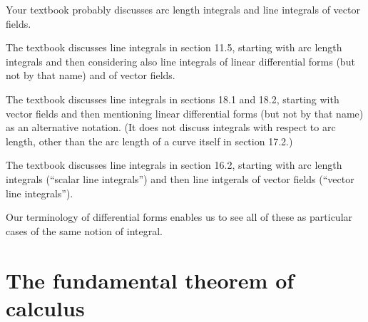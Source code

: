\documentclass[12pt]{amsart}
\begin{document}
\begin{notextbook}Your textbook probably discusses arc length integrals and line integrals of vector fields.\end{notextbook}%
\begin{stewart}The textbook discusses line integrals in section 11.5, starting with arc length integrals and then considering also line integrals of linear differential forms (but not by that name) and of vector fields.\end{stewart}%
\begin{hugheshallett}The textbook discusses line integrals in sections 18.1 and 18.2, starting with vector fields and then mentioning linear differential forms (but not by that name) as an alternative notation.
(It does not discuss integrals with respect to arc length, other than the arc length of a curve itself in section 17.2.)\end{hugheshallett}%
\begin{rogawski}The textbook discusses line integrals in section 16.2, starting with arc length integrals (``scalar line integrals'') and then line intgerals of vector fields (``vector line integrals'').\end{rogawski}
Our terminology of differential forms enables us to see all of these as particular cases of the same notion of integral.

\section{The fundamental theorem of calculus}
\label{sec:lineintegral-ftc}
\end{document}
